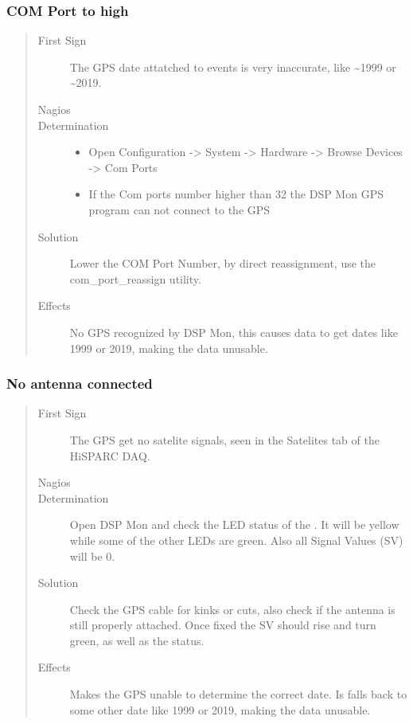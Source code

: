 \documentclass[a4paper,11pt,english]{sphinxmanual}
\begin{document}
\subsubsection{COM Port to high}
\label{known-issues:com-port-to-high}\begin{quote}\begin{description}
\item[{First Sign}] \leavevmode
The GPS date attatched to events is very inaccurate, like \textasciitilde{}1999 or \textasciitilde{}2019.

\item[{Nagios}] \leavevmode
\item[{Determination}] \leavevmode\begin{itemize}
\item {} 
Open Configuration -\textgreater{} System -\textgreater{} Hardware -\textgreater{} Browse Devices -\textgreater{} Com Ports

\item {} 
If the Com ports number higher than 32 the DSP Mon GPS program can not connect to the GPS

\end{itemize}

\item[{Solution}] \leavevmode
Lower the COM Port Number, by direct reassignment, use the com\_port\_reassign utility.

\item[{Effects}] \leavevmode
No GPS recognized by DSP Mon, this causes data to get dates like 1999 or 2019, making the data unusable.

\end{description}\end{quote}


\subsubsection{No antenna connected}
\label{known-issues:no-antenna-connected}\begin{quote}\begin{description}
\item[{First Sign}] \leavevmode
The GPS get no satelite signals, seen in the Satelites tab of the HiSPARC DAQ.

\item[{Nagios}] \leavevmode
\item[{Determination}] \leavevmode
Open DSP Mon and check the LED status of the . It will be yellow while some of the other LEDs are green. Also all Signal Values (SV) will be 0.

\item[{Solution}] \leavevmode
Check the GPS cable for kinks or cuts, also check if the antenna is still properly attached. Once fixed the SV should rise and turn green, as well as the  status.

\item[{Effects}] \leavevmode
Makes the GPS unable to determine the correct date. Is falls back to some other date like 1999 or 2019, making the data unusable.

\end{description}\end{quote}
\end{document}
